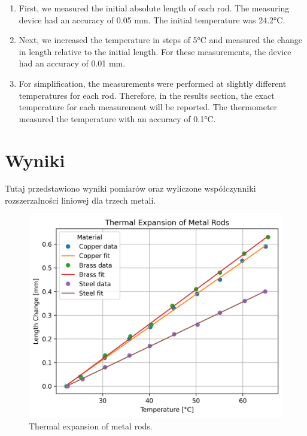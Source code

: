 \documentclass[a4paper,12pt]{article} %
\begin{document}
\begin{enumerate}
    \item First, we measured the initial absolute length of each rod. The measuring device had an accuracy of 0.05 mm. The initial temperature was 24.2°C.
    
    \item Next, we increased the temperature in steps of 5°C and measured the change in length relative to the initial length. For these measurements, the device had an accuracy of 0.01 mm. 
    
    \item For simplification, the measurements were performed at slightly different temperatures for each rod. Therefore, in the results section, the exact temperature for each measurement will be reported. The thermometer measured the temperature with an accuracy of 0.1°C.
\end{enumerate}

\section{Wyniki}

Tutaj przedstawiono wyniki pomiarów oraz wyliczone współczynniki rozszerzalności liniowej dla trzech metali.

\begin{figure}[h]
    \centering
    \includegraphics[width=1\textwidth]{expansion_plot.png}
    \caption{Thermal expansion of metal rods.}
    \label{fig:expansion_plot}
\end{figure}
\end{document}
